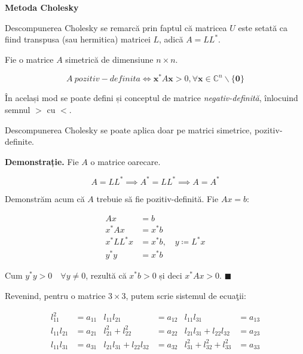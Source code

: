 \documentclass{exam}
\newcommand{\octavescript}[2]{
	
}
\begin{document}
\newpage
\octavescript{./src/doolittle.m}{}

\textbf{Metoda Cholesky}

\par Descompunerea Cholesky se remarcă prin faptul că matricea $U$ este setată
ca fiind transpusa (sau hermitica) matricei $L$, adică $A = LL^*$.

\par Fie o matrice $A$ simetrică de dimensiune $n \times n$.

\begin{equation*}
	A \ pozitiv-definita \Leftrightarrow \mathbf{x}^* A \mathbf{x} > 0, \forall \mathbf{x} \in \mathbb{C}^n \backslash \{\mathbf{0}\}
\end{equation*}

\par În același mod se poate defini și conceptul de matrice
\textit{negativ-definită}, înlocuind semnul $>$ cu $<$.

\par Descompunerea Cholesky se poate aplica doar pe matrici simetrice,
pozitiv-definite.

\textbf{Demonstrație.} Fie $A$ o matrice oarecare.

\begin{equation*}
	A = LL^* \implies A^* = LL^* \implies A = A^*
\end{equation*}

\par Demonstrăm acum că $A$ trebuie să fie pozitiv-definită. Fie $Ax = b$:

\begin{align*}
	Ax          & = b                             \\
	x^* A x     & = x^* b                         \\
	x^* L L^* x & = x^* b, \quad y \coloneq L^* x \\
	y^* y       & = x^* b
\end{align*}

\par Cum $y^* y > 0 \quad \forall y \neq 0$, rezultă că $x^* b > 0$ și deci
$x^* A x > 0$. $\blacksquare$

\newpage
\par Revenind, pentru o matrice $3 \times 3$, putem scrie sistemul de ecuaţii:

\begin{align*}
	l_{11}^2     & = a_{11} & l_{11}l_{21}                & = a_{12} & l_{11}l_{31}                   & = a_{13} \\
	l_{11}l_{21} & = a_{21} & l_{21}^2 + l_{22}^2         & = a_{22} & l_{21}l_{31} + l_{22}l_{32}    & = a_{23} \\
	l_{11}l_{31} & = a_{31} & l_{21}l_{31} + l_{22}l_{32} & = a_{32} & l_{31}^2 + l_{32}^2 + l_{33}^2 & = a_{33}
\end{align*}
\end{document}
